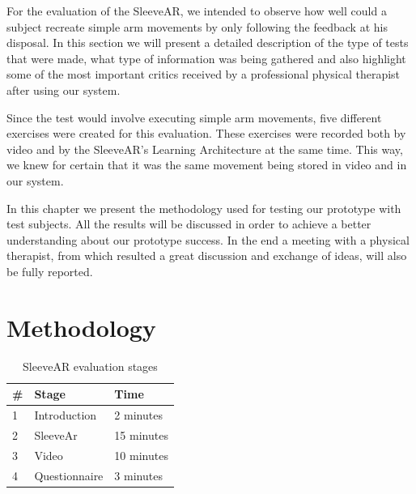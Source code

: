 For the evaluation of the SleeveAR, we intended to observe how well could a subject recreate simple arm movements by only following the feedback at his disposal. In this section we will present a detailed description of the type of tests that were made, what type of information was being gathered and also highlight some of the most important critics received by a professional physical therapist after using our system.

Since the test would involve executing simple arm movements, five different exercises were created for this evaluation.  These exercises were recorded both by video and by the SleeveAR's Learning Architecture at the same time. This way, we knew for certain that it was the same movement being stored in video and in our system.

In this chapter we present the methodology used for testing our prototype with test subjects. All the results will be discussed in order to achieve a better understanding about our prototype success. In the end a meeting with a physical therapist, from which resulted a great discussion and exchange of ideas, will also be fully reported.

\section{Methodology} \label{evaluation-methodology}

\begin{table}
\centering
\begin{tabular}{lll}
\hline
\multicolumn{1}{|l|}{\#}& \multicolumn{1}{l|}{Stage}         & \multicolumn{1}{l|}{Time}       \\ \hline
\multicolumn{1}{|l|}{1} & \multicolumn{1}{l|}{Introduction}  & \multicolumn{1}{l|}{2 minutes}  \\ \hline
\multicolumn{1}{|l|}{2} & \multicolumn{1}{l|}{SleeveAr}      & \multicolumn{1}{l|}{15 minutes} \\ \hline
\multicolumn{1}{|l|}{3} & \multicolumn{1}{l|}{Video}         & \multicolumn{1}{l|}{10 minutes} \\ \hline
\multicolumn{1}{|l|}{4} & \multicolumn{1}{l|}{Questionnaire} & \multicolumn{1}{l|}{3 minutes}  \\ \hline
\end{tabular}
\caption{SleeveAR evaluation stages}
\label{table:teststages}
\end{table}


